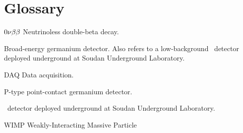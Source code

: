 \documentclass [11pt, twoside] {uwthesis}
\begin{document}
 
%

\prelimpages
 
%
%

{
 \def\thefootnote{\fnsymbol{footnote}}
 \let\footnoterule\relax
 \titlepage
 }
\setcounter{footnote}{0}
 
%
%


\signaturepage


%


  \doctoralquoteslip



%
%


\setcounter{page}{-1}
\abstract{%

}
 
%
%
\tableofcontents
\listoffigures
\listoftables  
 
%
%
\chapter*{Glossary}      %
\thispagestyle{plain}
%
\begin{glossary}
\item[$0 \nu \beta \beta$] Neutrinoless double-beta decay. 
\item[\bege] Broad-energy germanium detector.  Also refers to a low-background \ppc~detector deployed underground at Soudan Underground Laboratory.
\item[DAQ] Data acquisition.
\item[\ppc] P-type point-contact germanium detector.
\item[\ppc2] \ppc~detector deployed underground at Soudan Underground Laboratory.
\item[WIMP] Weakly-Interacting Massive Particle 
\end{glossary}
 
\end{document}
